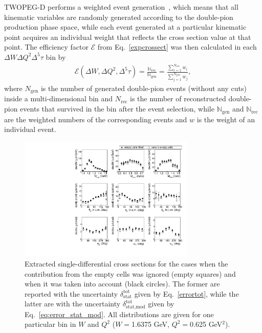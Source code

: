 \documentclass[prc,twocolumn,superscriptaddress,showpacs,amssymb,amsmath,amsfonts,aps,nofootinbib]{revtex4-1}
\begin{document}
TWOPEG-D performs a weighted event generation~\cite{twopeg}, which means that all kinematic variables are randomly generated according to the double-pion production phase space, while each event generated at a particular kinematic point acquires an individual weight that reflects the cross section value at that point.  The efficiency factor $\mathcal{E}$ from Eq.\!~\eqref{expcrossect} was then calculated in each $\Delta W\Delta Q^2\Delta^{5}\tau$ bin by
\begin{equation}
\begin{aligned}
\mathcal{E}(\Delta W, \Delta Q^2, \Delta^{5}\tau) = \frac{\mathbb{N}_{\text{rec}}}{\mathbb{N}_{\text{gen}}} =  \frac{\sum\limits_{i=1}^{N_{\text{rec}}} w_{i}}{\sum\limits_{j=1}^{N_{\text{gen}}} w_{j}} ,
\end{aligned}
\label{eq:eff}
\end{equation}
where $N_{\text{gen}}$ is the number of generated double-pion events (without any cuts) inside a multi-dimensional bin and $N_{\text{rec}}$ is the number of reconstructed double-pion events that survived in the bin after the event selection, while $\mathbb{N}_{\text{gen}}$ and  $\mathbb{N}_{\text{rec}}$ are the weighted numbers of the corresponding events and $w$ is the weight of an individual event.

\begin{figure}[htp]
\begin{center}
\includegraphics[width=0.75\textwidth]{pictures/corrections/cr_sec_all_top_new2.pdf}
\caption{\small Extracted single-differential cross sections for the cases when the contribution from the empty cells was ignored (empty squares) and when it was taken into account (black circles). The former are reported with the uncertainty $\delta_{\text{stat}}^{\text{tot}}$ given by Eq.\!~\eqref{errortot}, while the latter are with the uncertainty $\delta_{\text{stat,mod}}^{\text{tot}}$ given by Eq.\!~\eqref{eq:error_stat_mod}. All distributions are given for one particular bin in $W$ and $Q^2$ ($W = $1.6375 GeV, $Q^2 = $0.625 GeV$^2$).} \label{fig:empt_corr}
\end{center}
\end{figure}
\end{document}
